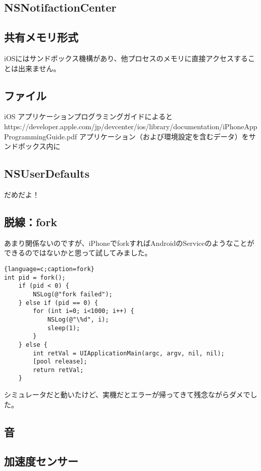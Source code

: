 \documentclass{jsarticle}
\begin{document}
\subsection{NSNotifactionCenter}

\subsection{共有メモリ形式}
iOSにはサンドボックス機構があり、他プロセスのメモリに直接アクセスすることは出来ません。

\subsection{ファイル}
iOS アプリケーションプログラミングガイドによると
https://developer.apple.com/jp/devcenter/ios/library/documentation/iPhoneAppProgrammingGuide.pdf
アプリケーション（および環境設定を含むデータ）をサンドボックス内に

\subsection{NSUserDefaults}
だめだよ！

\subsection{脱線：fork}
あまり関係ないのですが、iPhoneでforkすればAndroidのServiceのようなことができるのではないかと思って試してみました。
\begin{lstlisting}{language=c;caption=fork}
int pid = fork();
	if (pid < 0) {
		NSLog(@"fork failed");
	} else if (pid == 0) {
		for (int i=0; i<1000; i++) {
			NSLog(@"\%d", i);
			sleep(1);
		}
	} else {
		int retVal = UIApplicationMain(argc, argv, nil, nil);
		[pool release];
		return retVal;
	}
\end{lstlisting}
シミュレータだと動いたけど、実機だとエラーが帰ってきて残念ながらダメでした。

\subsection{音}

\subsection{加速度センサー}
\end{document}

